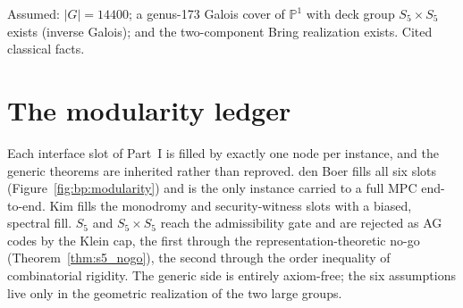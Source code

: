 \begin{definition}
  \label{ax:s5x5}
  Assumed: $|G|=14400$; a genus-173 Galois cover of $\mathbb{P}^1$ with deck
  group $S_5\times S_5$ exists (inverse Galois); and the two-component Bring
  realization exists. Cited classical facts.
\end{definition}

\chapter{The modularity ledger}

Each interface slot of Part~I is filled by exactly one node per instance, and
the generic theorems are inherited rather than reproved. den Boer fills all six
slots (Figure~\ref{fig:bp:modularity}) and is the only instance carried to a
full MPC end-to-end. Kim fills the monodromy and security-witness slots with a
biased, spectral fill. $S_5$ and $S_5\times S_5$ reach the admissibility gate
and are rejected as AG codes by the Klein cap, the first through the
representation-theoretic no-go (Theorem~\ref{thm:s5_nogo}), the second through
the order inequality of combinatorial rigidity. The generic side is entirely
axiom-free; the six assumptions live only in the geometric realization of the
two large groups.
